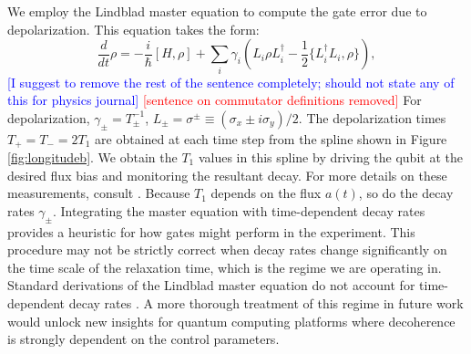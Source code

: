 We employ the Lindblad master equation
to compute the gate error due to depolarization.
This equation takes the form:
\begin{equation}
  \frac{d}{dt} \rho = -\frac{i}{\hbar} [H, \rho]
  + \sum_{i} \gamma_{i} (L_{i} \rho L_{i}^{\dagger}
  - \frac{1}{2} \{L_{i}^{\dagger} L_{i}, \rho\}),
\end{equation}
\textcolor{blue}{[I suggest to remove the rest of the sentence completely; should not state any of this for physics journal]}
\textcolor{red}{[sentence on commutator definitions removed]}
For depolarization, $\gamma_{\pm} = T_{\pm}^{-1}$,
$L_{\pm} = \sigma^{\pm} \equiv (\sigma_{x} \pm i \sigma_{y})/2$.
The depolarization times $T_{+} = T_{-} = 2 T_{1}$ are obtained at each time step
from the spline shown in Figure \ref{fig:longitudeb}.
We obtain the $T_{1}$ values in this spline
by driving the qubit at the desired flux bias
and monitoring the resultant decay. For more details
on these measurements, consult \cite{zhang2020universal}.
Because $T_{1}$ depends on the flux $a(t)$, so do
the decay rates $\gamma_{\pm}$.
Integrating the master equation with time-dependent decay rates
provides a heuristic for how gates might  perform in
the experiment. 
This procedure may not be strictly correct
when decay rates change significantly on the time scale of the relaxation time,
which is the regime we are operating in. Standard
derivations of the Lindblad master equation do not account for
time-dependent decay rates \cite{manzano2020a}. A more thorough
treatment of this regime in future work would unlock new insights for
quantum computing platforms where decoherence is strongly
dependent on the control parameters.

